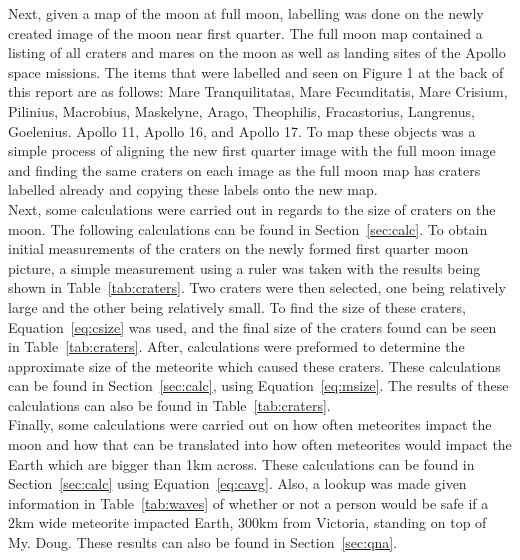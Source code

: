 \documentclass{article}
\begin{document}
Next, given a map of the moon at full moon, labelling was done on the newly created image of the moon near first quarter. The full moon map
contained a listing of all craters and mares on the moon as well as landing sites of the Apollo space missions. The items that were labelled and
seen on Figure 1 at the back of this report are as follows: Mare Tranquilitatas, Mare Fecunditatis, Mare Crisium, Pilinius, Macrobius, Maskelyne,
 Arago, Theophilis, 
Fracastorius, Langrenus, Goelenius. Apollo 11, Apollo 16, and Apollo 17. To map these objects was a simple process of aligning the new first quarter
image with the full moon image and finding the same craters on each image as the full moon map has craters labelled already and copying these labels
onto the new map.\\

Next, some calculations were carried out in regards to the size of craters on the moon. The following calculations can be found in Section~\ref{sec:calc}.
To obtain initial measurements of the craters on the newly formed first quarter 
moon picture, a simple measurement using a ruler was taken with the results being shown in Table~\ref{tab:craters}.
Two craters were then selected, one being relatively large and the other being relatively small. To find the size of these craters, Equation~\ref{eq:csize} was used,
and the final size of the craters found can be seen in Table~\ref{tab:craters}. 
After, calculations were preformed to determine the approximate size of the
meteorite which caused these craters. These calculations can be found in Section~\ref{sec:calc}, using Equation~\ref{eq:msize}. The results of these
calculations can also be found in Table~\ref{tab:craters}.  \\

Finally, some calculations were carried out on how often meteorites impact the moon and how that can be translated into how often meteorites
would impact the Earth which are bigger than 1km across. These calculations can be found in Section~\ref{sec:calc} using Equation~\ref{eq:cavg}. 
Also, a lookup was made given
information in Table~\ref{tab:waves} of whether or not a person would be safe if a 2km wide meteorite impacted Earth, 300km from Victoria,
standing on top of My. Doug. These results can also be found in Section~\ref{sec:qna}.\\


\end{document}
